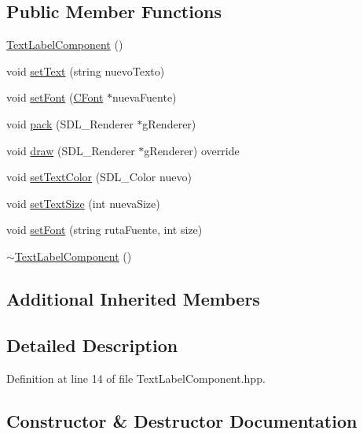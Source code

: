 \subsection*{Public Member Functions}
\begin{DoxyCompactItemize}
\item 
\hyperlink{class_text_label_component_a37b5e1b699fa4dac42e13122c6925347}{Text\+Label\+Component} ()
\item 
void \hyperlink{class_text_label_component_a18b7058e401b67aef1a4a231a2fa4c2a}{set\+Text} (string nuevo\+Texto)
\item 
void \hyperlink{class_text_label_component_a454bc90325a888a07bd1d5622d883eb9}{set\+Font} (\hyperlink{class_c_font}{C\+Font} $\ast$nueva\+Fuente)
\item 
void \hyperlink{class_text_label_component_a3a3438a54f1cd9e8031b60f2c3f705f7}{pack} (S\+D\+L\+\_\+\+Renderer $\ast$g\+Renderer)
\item 
void \hyperlink{class_text_label_component_a6ca146eebb7ec244679223426a9d71da}{draw} (S\+D\+L\+\_\+\+Renderer $\ast$g\+Renderer) override
\item 
void \hyperlink{class_text_label_component_a6f01e610b6f92e2535e6caf2ece93647}{set\+Text\+Color} (S\+D\+L\+\_\+\+Color nuevo)
\item 
void \hyperlink{class_text_label_component_a9d7e77c8dcae20ca70dde0e4a56111c0}{set\+Text\+Size} (int nueva\+Size)
\item 
void \hyperlink{class_text_label_component_a5e2d9878b6bfbf45ef8cd2a52c1f10eb}{set\+Font} (string ruta\+Fuente, int size)
\item 
\hyperlink{class_text_label_component_ae233916da76cb47d0dc5abb4ea0143b1}{$\sim$\+Text\+Label\+Component} ()
\end{DoxyCompactItemize}
\subsection*{Additional Inherited Members}


\subsection{Detailed Description}


Definition at line 14 of file Text\+Label\+Component.\+hpp.



\subsection{Constructor \& Destructor Documentation}
